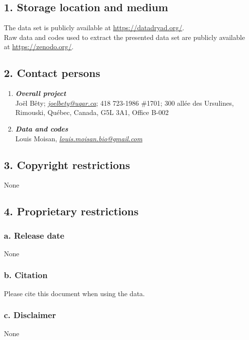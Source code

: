 \documentclass[a4paper,twoside,12pt]{article}
\begin{document}
                \subsection*{1. Storage location and medium}
The data set is publicly available at \url{https://datadryad.org/}.\\[1.5em]
Raw data and codes used to extract the presented data set are publicly available at \url{https://zenodo.org/}.
                 
        \subsection*{2. Contact persons}
        \begin{enumerate}[label=\alph*.]
                        \item[] \textit{\textbf{Overall project}}\\
                        Joël Bêty; \textit{\href{mailto:joel_bety@uqar.ca}{joel{\textunderscore}bety@uqar.ca}}; 418 723-1986 \#1701; 300 allée des Ursulines, Rimouski, Québec, Canada, G5L 3A1, Office B-002
                        \item[] \textit{\textbf{Data and codes}}\\
                         Louis Moisan, \textit{\href{mailto:louis.moisan.bio@gmail.com}{louis.moisan.bio@gmail.com}}
                \end{enumerate}
                \subsection*{3. Copyright restrictions}
                None
                 
                \subsection*{4. Proprietary restrictions}
                        \subsubsection*{a. Release date} None
                        \subsubsection*{b. Citation}
                         Please cite this document when using the data.
                        \subsubsection*{c. Disclaimer} None
                        
\end{document}
